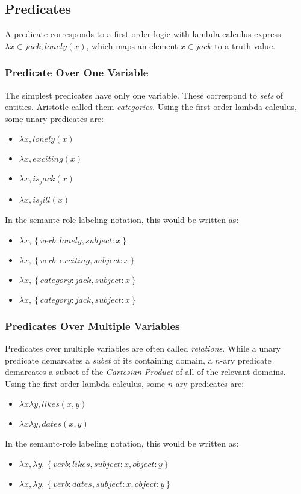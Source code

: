 \documentclass[12pt]{article}
\begin{document}
\subsection{Predicates}
A predicate corresponds to a first-order logic with lambda calculus express $\lambda x \in jack, lonely(x)$, which maps an element $x \in jack$ to a truth value.
\subsubsection{Predicate Over One Variable}
The simplest predicates have only one variable. These correspond to {\em sets} of entities. Aristotle called them {\em categories}.
Using the first-order lambda calculus, some unary predicates are:
\begin{itemize}
    \item $\lambda x, lonely(x)$
    \item $\lambda x, exciting(x)$
    \item $\lambda x, is_jack(x)$
    \item $\lambda x, is_jill(x)$
\end{itemize}
In the semantc-role labeling notation, this would be written as:
\begin{itemize}
    \item $\lambda x, \left\{verb: lonely, subject: x\right\}$
    \item $\lambda x, \left\{verb: exciting, subject: x\right\}$
    \item $\lambda x, \left\{category: jack, subject: x\right\}$
    \item $\lambda x, \left\{category: jack, subject: x\right\}$
\end{itemize}

\subsubsection{Predicates Over Multiple Variables}
Predicates over multiple variables are often called {\em relations}.
While a unary predicate demarcates a {\em subet} of its containing domain, a $n$-ary predicate demarcates a subset of the {\em Cartesian Product} of all of the relevant domains.
Using the first-order lambda calculus, some $n$-ary predicates are:
\begin{itemize}
    \item $\lambda x \lambda y, likes(x, y)$
    \item $\lambda x \lambda y, dates(x, y)$
\end{itemize}
In the semantc-role labeling notation, this would be written as:
\begin{itemize}
    \item $\lambda x, \lambda y, \left\{verb: likes, subject: x, object: y\right\}$
    \item $\lambda x, \lambda y, \left\{verb: dates, subject: x, object: y\right\}$
\end{itemize}
\end{document}
